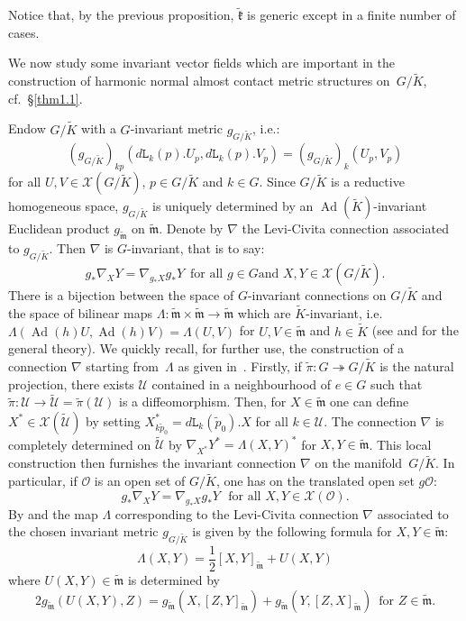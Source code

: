 \documentclass[a4paper,reqno]{amsart}
\theoremstyle{definition}
\theoremstyle{remark}
\theoremstyle{plain}
\numberwithin{equation}{section}
\newcommand{\calX}{{\mathcal{X}}}
\newcommand{\calO}{{\mathcal{O}}}  \newcommand{\cO}{{\mathcal{O}}}
\newcommand{\sto}{\twoheadrightarrow}
\DeclareMathOperator{\Ad}{{Ad}}
\newcommand{\Kt}{{\widetilde{K}}}
\newcommand{\wK}{{\widetilde{K}}}
\newcommand{\wk}{{\widetilde{\mathfrak{k}}}}
\newcommand{\Ut}{{\widetilde{\mathcal{U}}}}
\newcommand{\wm}{{\widetilde{\mathfrak{m}}}}
\newcommand{\wpi}{{\widetilde{\pi}}}
\newcommand{\wpzero}{{\tilde{p}_0}}
\newcommand{\ltr}{\mathtt{L}}
\newcommand{\half}{{\frac{1}{2}}}
\begin{document}
\noindent Notice that, by the previous proposition, $\wk$
is generic except in a finite number of cases.

We now study some invariant vector fields which are important in
the construction of harmonic normal almost contact metric
structures on~$G/\Kt$, cf.~\S\ref{thm1.1}. %

Endow $G/\Kt$ with a $G$-invariant metric $g_{\scriptscriptstyle{G/\wK}}$, i.e.:
\[
(g_{\scriptscriptstyle{G/\wK}})_{kp}(d\ltr_k(p).U_{p},d\ltr_k(p).V_{p}) =
(g_{\scriptscriptstyle{G/\wK}})_{k}(U_{p},V_{p}) %
\]
for all $U,V \in \calX(G/\Kt)$, $p \in G/\Kt$ and $k \in
G$. Since $G/\Kt$ is a reductive homogeneous space, $g_{\scriptscriptstyle{G/\wK}}$ is
uniquely determined by an $\Ad(\wK)$-invariant Euclidean product
$g_\wm$ on $\wm$. Denote by $\nabla$ the Levi-Civita connection
associated to $g_{\scriptscriptstyle{G/\wK}}$. Then $\nabla$ is $G$-invariant, that is to
say:
\begin{equation*} \label{eq2.1c}
 g_* \nabla_X Y = \nabla_{g_*X} g_*Y  \ \; \text{for all $g\in G$
   and $X,Y \in \calX(G/\Kt)$.}
\end{equation*}
There is a bijection between the space of $G$-invariant
  connections on $G/\Kt$ and the space of bilinear maps $\Lambda:
  \wm \times \wm \to \wm$ which are $\wK$-invariant,
  i.e.~$\Lambda(\Ad(h)U,\Ad(h)V) =\Lambda(U,V)$ for $U,V \in \wm$ and $h
  \in \wK$ (see \cite{Nom}
  and \cite{KN} for the general theory).
We quickly recall, for further use, the construction of a connection $\nabla$
starting from~$\Lambda$ as given in~\cite[\S 7]{Nom}.  Firstly, if
$\wpi : G \sto G/\wK$ is the natural projection, there exists $\mathcal{U}$ contained in a neighbourhood of
$e \in G$ such that
$\wpi : \mathcal{U} \to \Ut= \wpi(\mathcal{U})$ is a diffeomorphism. 
Then, for $X \in \wm$ one can define $X^* \in \calX(\Ut)$ by
setting $X^*_{k\wpzero} = d\ltr_k(\wpzero).X$ for all $k \in \mathcal{U}$.
The connection $\nabla$ is completely determined on $\Ut$ by
$\nabla_{X^*}Y^* = \Lambda(X,Y)^*$ for $X,Y \in \wm$. 
This local construction then furnishes the invariant connection $\nabla$ on
the manifold~$G/\Kt$. In particular, if $\calO$ is an open set 
of $G/\Kt$, one has on the translated open set $g\calO$:
\begin{equation}
  \label{eq2.1b}
 g_*\nabla_XY =
\nabla_{g_*X}g_*Y \ \; \, \text{for all $X, Y \in \calX(\calO)$}. 
\end{equation}
By \cite[Theorem~13.1]{Nom} and
\cite[Theorem~3.3 \& p.~202]{KN} the map $\Lambda$ corresponding to the Levi-Civita connection
$\nabla$ associated to the chosen invariant metric $g_{\scriptscriptstyle{G/\wK}}$ is given by the
following formula for $X,Y \in \wm$:
\begin{equation}
  \label{eq2.2}
\Lambda(X,Y) = \half [X,Y]_\wm + U(X,Y)   
\end{equation}
where $U(X,Y) \in \wm$ is determined by
\begin{equation}
  \label{eq2.3}
 2g_\wm(U(X,Y),Z) = g_\wm(X,[Z,Y]_\wm) +
   g_\wm(Y,[Z,X]_\wm) \  \; \text{for $Z \in \wm$.}
\end{equation}
\end{document}
